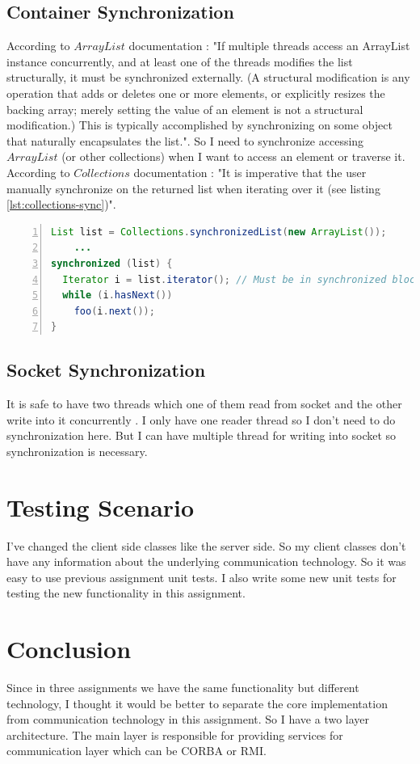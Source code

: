 \documentclass[12pt]{article}
\begin{document}
\subsection{Container Synchronization}
According to $ArrayList$ documentation \cite{ArrayList}: "If multiple threads access an ArrayList instance concurrently, and at least one of the threads modifies the list structurally, it must be synchronized externally. (A structural modification is any operation that adds or deletes one or more elements, or explicitly resizes the backing array; merely setting the value of an element is not a structural modification.) This is typically accomplished by synchronizing on some object that naturally encapsulates the list.". So I need to synchronize accessing $ArrayList$ (or other collections) when I want to access an element or traverse it. According to $Collections$ documentation \cite{Collections}: "It is imperative that the user manually synchronize on the returned list when iterating over it (see listing \ref{lst:collections-sync})".

\begin{lstlisting}[language=java,label={lst:collections-sync},caption={Collections Synchronization},numbers=left]
List list = Collections.synchronizedList(new ArrayList());
    ...
synchronized (list) {
  Iterator i = list.iterator(); // Must be in synchronized block
  while (i.hasNext())
    foo(i.next());
}
\end{lstlisting}

\subsection{Socket Synchronization}
It is safe to have two threads which one of them read from socket and the other write into it concurrently \cite{socket-full-duplex}. I only have one reader thread so I don't need to do synchronization here. But I can have multiple thread for writing into socket so synchronization is necessary.

\section{Testing Scenario}
I've changed the client side classes like the server side. So my client classes don't have any information about the underlying communication technology. So it was easy to use previous assignment unit tests. I also write some new unit tests for testing the new functionality in this assignment.
\section{Conclusion}
Since in three assignments we have the same functionality but different technology, I thought it would be better to separate the core implementation from communication technology in this assignment. So I have a two layer architecture. The main layer is responsible for providing services for communication layer which can be CORBA or RMI.


\end{document}
